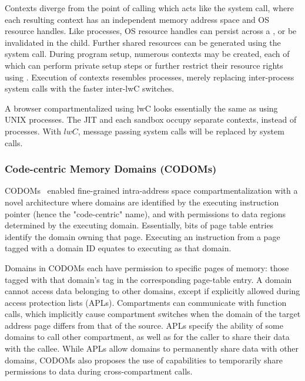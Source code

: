 Contexts diverge from the point of calling  which acts like
the  system call, where each resulting context has an 
independent memory address space and OS resource handles.
Like processes, OS resource handles can persist across a , or be
invalidated in the child.
Further shared resources can be generated using the  system 
call.
During program setup, numerous contexts may be created, each of which can
perform private setup steps or further restrict their resource rights using
.
Execution of contexts resembles processes, merely replacing inter-process system
calls with the faster inter-lwC switches.

A browser compartmentalized using lwC looks essentially the same as
using UNIX processes. 
The JIT and each sandbox occupy separate contexts, instead of processes.
With $lwC$, message passing system calls will be replaced by
 system calls.

\subsubsection{Code-centric Memory Domains (CODOMs)}
CODOMs~\cite{VilanovaBNEV14} enabled fine-grained intra-address space 
compartmentalization
with a novel architecture where domains are identified by the executing
instruction pointer (hence the "code-centric" name), and with permissions
to data regions determined by the executing domain. 
Essentially, bits of page table entries identify the domain owning that
page.
Executing an instruction from a page tagged with a domain ID equates to
executing as that domain.

Domains in CODOMs each have permission to specific pages of memory: 
those tagged with that domain's tag in the corresponding page-table entry.
A domain cannot access data belonging to other domains, except if
explicitly allowed during access protection lists (APLs).
Compartments can communicate with function calls, which implicitly
cause compartment switches when the domain of the target address page
differs from that of the source.
APLs specify the ability of some domains to call other compartment,
as well as for the caller to share their data with the callee.
While APLs allow domains to permanently share data with other domains,
CODOMs also proposes the use of capabilities to temporarily share
permissions to data during cross-compartment calls.


